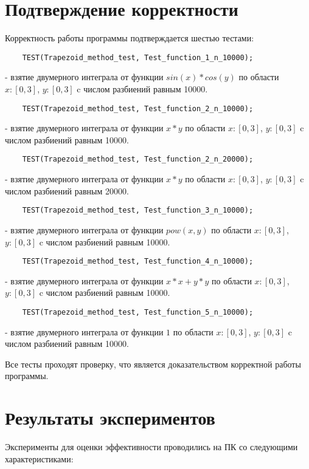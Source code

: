 \documentclass{report}
\begin{document}
\section*{Подтверждение корректности}
Корректность работы программы подтверждается шестью тестами:
\begin{lstlisting}
	TEST(Trapezoid_method_test, Test_function_1_n_10000);
\end{lstlisting}\par - взятие двумерного интеграла от функции $sin(x) * cos(y)$ по области $x : [0, 3]$, $y : [0, 3]$ c числом разбиений равным 10000. 
\begin{lstlisting}
	TEST(Trapezoid_method_test, Test_function_2_n_10000);
\end{lstlisting}\par - взятие двумерного интеграла от функции $x * y$ по области $x : [0, 3]$, $y : [0, 3]$ c числом разбиений равным 10000.
\begin{lstlisting}
    TEST(Trapezoid_method_test, Test_function_2_n_20000);
\end{lstlisting}\par - взятие двумерного интеграла от функции $x * y$ по области $x : [0, 3]$, $y : [0, 3]$ c числом разбиений равным 20000.
\begin{lstlisting}
    TEST(Trapezoid_method_test, Test_function_3_n_10000);
\end{lstlisting}\par - взятие двумерного интеграла от функции $pow(x, y)$ по области $x : [0, 3]$, $y : [0, 3]$ c числом разбиений равным 10000.
\begin{lstlisting}
    TEST(Trapezoid_method_test, Test_function_4_n_10000);
\end{lstlisting}\par - взятие двумерного интеграла от функции $x * x + y * y$ по области $x : [0, 3]$, $y : [0, 3]$ c числом разбиений равным 10000.
\begin{lstlisting}
    TEST(Trapezoid_method_test, Test_function_5_n_10000);
\end{lstlisting}\par - взятие двумерного интеграла от функции $1$ по области $x : [0, 3]$, $y : [0, 3]$ c числом разбиений равным 10000.
\par Все тесты проходят проверку, что является доказательством корректной работы программы.
\newpage

\section*{Результаты экспериментов}
Эксперименты для оценки эффективности проводились на ПК со следующими характеристиками:
\end{document}

